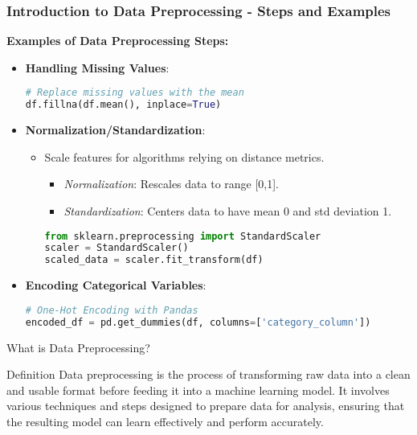 \documentclass[aspectratio=169]{beamer}
\begin{document}
\begin{frame}[fragile]
    \frametitle{Introduction to Data Preprocessing - Steps and Examples}
    \textbf{Examples of Data Preprocessing Steps:}
    
    \begin{itemize}
        \item \textbf{Handling Missing Values}:
        \begin{lstlisting}[language=Python]
# Replace missing values with the mean
df.fillna(df.mean(), inplace=True)
        \end{lstlisting}
        
        \item \textbf{Normalization/Standardization}:
        \begin{itemize}
            \item Scale features for algorithms relying on distance metrics.
            \begin{itemize}
                \item \textit{Normalization}: Rescales data to range [0,1].
                \item \textit{Standardization}: Centers data to have mean 0 and std deviation 1.
            \end{itemize}
            \begin{lstlisting}[language=Python]
from sklearn.preprocessing import StandardScaler
scaler = StandardScaler()
scaled_data = scaler.fit_transform(df)
            \end{lstlisting}
        \end{itemize}
        
        \item \textbf{Encoding Categorical Variables}:
        \begin{lstlisting}[language=Python]
# One-Hot Encoding with Pandas
encoded_df = pd.get_dummies(df, columns=['category_column'])
        \end{lstlisting}
    \end{itemize}
\end{frame}

\begin{frame}[fragile]{What is Data Preprocessing?}
    \begin{block}{Definition}
        Data preprocessing is the process of transforming raw data into a clean and usable format before feeding it into a machine learning model. It involves various techniques and steps designed to prepare data for analysis, ensuring that the resulting model can learn effectively and perform accurately.
    \end{block}
\end{frame}
\end{document}
